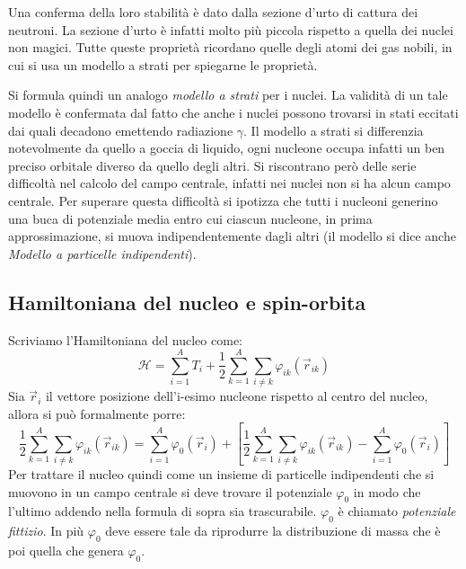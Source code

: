 Una conferma della loro stabilità è dato dalla sezione d'urto di cattura dei
neutroni. La sezione d'urto è infatti molto più piccola rispetto a quella dei
nuclei non magici. Tutte queste proprietà ricordano quelle degli atomi dei gas
nobili, in cui si usa un modello a strati per spiegarne le proprietà.

Si formula quindi un analogo \textit{modello a strati} per i nuclei. La validità
di un tale modello è confermata dal fatto che anche i nuclei possono trovarsi in
stati eccitati dai quali decadono emettendo radiazione $\gamma$. Il modello a
strati si differenzia notevolmente da quello a goccia di liquido, ogni nucleone
occupa infatti un ben preciso orbitale diverso da quello degli altri. Si
riscontrano però delle serie difficoltà nel calcolo del campo centrale, infatti
nei nuclei non si ha alcun campo centrale. Per superare questa difficoltà si
ipotizza che tutti i nucleoni generino una buca di potenziale media entro cui
ciascun nucleone, in prima approssimazione, si muova indipendentemente dagli
altri (il modello si dice anche \textit{Modello a particelle indipendenti}).


\subsection{Hamiltoniana del nucleo e  spin-orbita}
Scriviamo l'Hamiltoniana del nucleo come:
\begin{equation}
\mathcal{H} = \sum_{i=1}^A T_i + \frac{1}{2} \sum_{k=1}^A \sum_{i \ne k} \varphi_{ik}{\left( \vec{r}_{ik}\right)} 
\end{equation}
Sia $\vec{r}_i$ il vettore posizione dell'i-esimo nucleone rispetto al centro del nucleo, allora si può formalmente porre:
\begin{equation}
\frac{1}{2} \sum_{k=1}^A \sum_{i \ne k} \varphi_{ik}{\left( \vec{r}_{ik}\right)} = \sum_{i=1}^A \varphi_0{(\vec{r}_i)} + \left[ \frac{1}{2} \sum_{k=1}^A \sum_{i \ne k} \varphi_{ik}{\left( \vec{r}_{ik}\right)} - \sum_{i=1}^A \varphi_0{(\vec{r}_i)} \right] 
\end{equation}
Per trattare il nucleo quindi come un insieme di particelle indipendenti che si muovono in un campo centrale si deve trovare il potenziale $\varphi_0$ in modo che l'ultimo addendo nella formula di sopra sia trascurabile. $\varphi_0$ è chiamato \textit{potenziale fittizio}. In più $\varphi_0$ deve essere tale da riprodurre la distribuzione di massa che è poi quella che genera $\varphi_0$.

